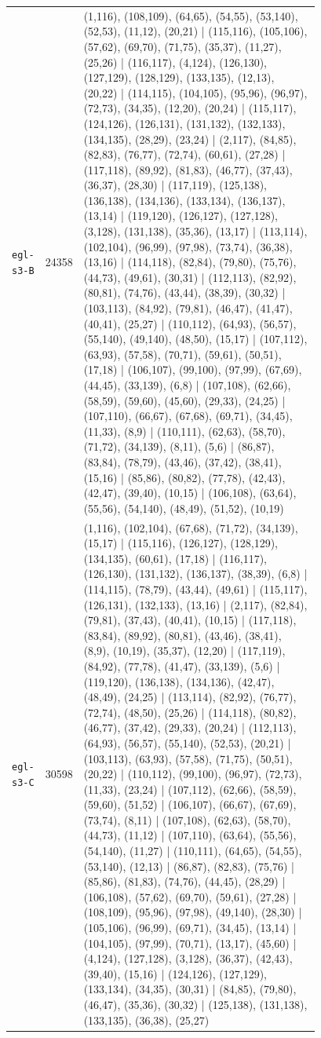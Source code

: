 \begin{landscape}
\begin{longtable}{lr>{\tiny\raggedright\arraybackslash}p{0.78\linewidth}}
\texttt{egl-s3-B} & 24358 & (1,116), (108,109), (64,65), (54,55), (53,140), (52,53), (11,12), (20,21) | (115,116), (105,106), (57,62), (69,70), (71,75), (35,37), (11,27), (25,26) | (116,117), (4,124), (126,130), (127,129), (128,129), (133,135), (12,13), (20,22) | (114,115), (104,105), (95,96), (96,97), (72,73), (34,35), (12,20), (20,24) | (115,117), (124,126), (126,131), (131,132), (132,133), (134,135), (28,29), (23,24) | (2,117), (84,85), (82,83), (76,77), (72,74), (60,61), (27,28) | (117,118), (89,92), (81,83), (46,77), (37,43), (36,37), (28,30) | (117,119), (125,138), (136,138), (134,136), (133,134), (136,137), (13,14) | (119,120), (126,127), (127,128), (3,128), (131,138), (35,36), (13,17) | (113,114), (102,104), (96,99), (97,98), (73,74), (36,38), (13,16) | (114,118), (82,84), (79,80), (75,76), (44,73), (49,61), (30,31) | (112,113), (82,92), (80,81), (74,76), (43,44), (38,39), (30,32) | (103,113), (84,92), (79,81), (46,47), (41,47), (40,41), (25,27) | (110,112), (64,93), (56,57), (55,140), (49,140), (48,50), (15,17) | (107,112), (63,93), (57,58), (70,71), (59,61), (50,51), (17,18) | (106,107), (99,100), (97,99), (67,69), (44,45), (33,139), (6,8) | (107,108), (62,66), (58,59), (59,60), (45,60), (29,33), (24,25) | (107,110), (66,67), (67,68), (69,71), (34,45), (11,33), (8,9) | (110,111), (62,63), (58,70), (71,72), (34,139), (8,11), (5,6) | (86,87), (83,84), (78,79), (43,46), (37,42), (38,41), (15,16) | (85,86), (80,82), (77,78), (42,43), (42,47), (39,40), (10,15) | (106,108), (63,64), (55,56), (54,140), (48,49), (51,52), (10,19) \\[2pt]
\texttt{egl-s3-C} & 30598 & (1,116), (102,104), (67,68), (71,72), (34,139), (15,17) | (115,116), (126,127), (128,129), (134,135), (60,61), (17,18) | (116,117), (126,130), (131,132), (136,137), (38,39), (6,8) | (114,115), (78,79), (43,44), (49,61) | (115,117), (126,131), (132,133), (13,16) | (2,117), (82,84), (79,81), (37,43), (40,41), (10,15) | (117,118), (83,84), (89,92), (80,81), (43,46), (38,41), (8,9), (10,19), (35,37), (12,20) | (117,119), (84,92), (77,78), (41,47), (33,139), (5,6) | (119,120), (136,138), (134,136), (42,47), (48,49), (24,25) | (113,114), (82,92), (76,77), (72,74), (48,50), (25,26) | (114,118), (80,82), (46,77), (37,42), (29,33), (20,24) | (112,113), (64,93), (56,57), (55,140), (52,53), (20,21) | (103,113), (63,93), (57,58), (71,75), (50,51), (20,22) | (110,112), (99,100), (96,97), (72,73), (11,33), (23,24) | (107,112), (62,66), (58,59), (59,60), (51,52) | (106,107), (66,67), (67,69), (73,74), (8,11) | (107,108), (62,63), (58,70), (44,73), (11,12) | (107,110), (63,64), (55,56), (54,140), (11,27) | (110,111), (64,65), (54,55), (53,140), (12,13) | (86,87), (82,83), (75,76) | (85,86), (81,83), (74,76), (44,45), (28,29) | (106,108), (57,62), (69,70), (59,61), (27,28) | (108,109), (95,96), (97,98), (49,140), (28,30) | (105,106), (96,99), (69,71), (34,45), (13,14) | (104,105), (97,99), (70,71), (13,17), (45,60) | (4,124), (127,128), (3,128), (36,37), (42,43), (39,40), (15,16) | (124,126), (127,129), (133,134), (34,35), (30,31) | (84,85), (79,80), (46,47), (35,36), (30,32) | (125,138), (131,138), (133,135), (36,38), (25,27) \\[2pt]

\end{longtable}
\end{landscape}
